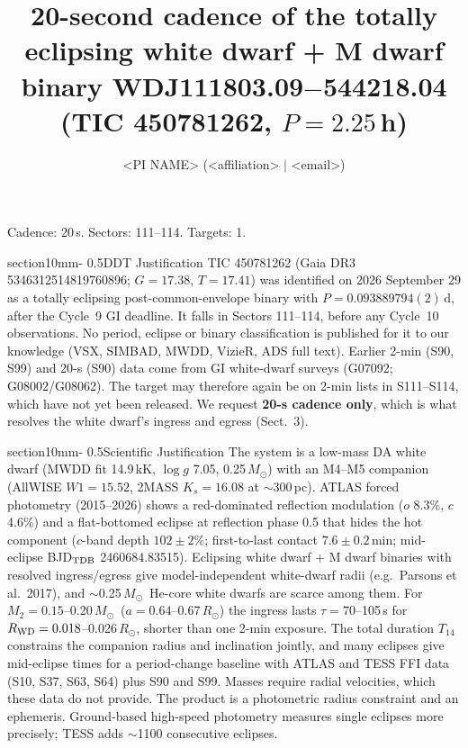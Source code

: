 \documentclass[letterpaper,11pt]{article}
\title{20-second cadence of the totally eclipsing white dwarf + M dwarf binary WDJ111803.09$-$544218.04 (TIC 450781262, $P=2.25$\,h)}
\author{<PI NAME> (<affiliation> $|$ <email>)}
\date{}
\makeatletter
\renewcommand{\section}{\@startsection%
{section}{1}{0mm}{-\baselineskip}%
{0.5\baselineskip}{\normalfont\Large\bfseries}}%
\newcommand{\msun}{$M_{\odot}$}
\newcommand{\rsun}{$R_{\odot}$}
\makeatother
\begin{document}
\pagestyle{plain}
\maketitle
\vspace{-2em}
\noindent Cadence: 20\,s. Sectors: 111--114. Targets: 1.

\section{DDT Justification}
TIC 450781262 (Gaia DR3 5346312514819760896; $G=17.38$, $T=17.41$) was identified on 2026 September 29 as a totally eclipsing post-common-envelope binary with $P=0.093889794(2)$\,d, after the Cycle~9 GI deadline. It falls in Sectors 111--114, before any Cycle~10 observations. No period, eclipse or binary classification is published for it to our knowledge (VSX, SIMBAD, MWDD, VizieR, ADS full text). Earlier 2-min (S90, S99) and 20-s (S90) data come from GI white-dwarf surveys (G07092; G08002/G08062). The target may therefore again be on 2-min lists in S111--S114, which have not yet been released. We request \textbf{20-s cadence only}, which is what resolves the white dwarf's ingress and egress (Sect.~3).

\section{Scientific Justification}
The system is a low-mass DA white dwarf (MWDD fit 14.9\,kK, $\log g$ 7.05, 0.25\,\msun) with an M4--M5 companion (AllWISE $W1=15.52$, 2MASS $K_s=16.08$ at $\sim$300\,pc). ATLAS forced photometry (2015--2026) shows a red-dominated reflection modulation ($o$ 8.3\%, $c$ 4.6\%) and a flat-bottomed eclipse at reflection phase 0.5 that hides the hot component ($c$-band depth $102\pm2$\%; first-to-last contact $7.6\pm0.2$\,min; mid-eclipse BJD$_{\rm TDB}$ 2460684.83515). Eclipsing white dwarf + M dwarf binaries with resolved ingress/egress give model-independent white-dwarf radii (e.g.\ Parsons et al.\ 2017), and $\sim$0.25\,\msun\ He-core white dwarfs are scarce among them. For $M_2=0.15$--0.20\,\msun\ ($a=0.64$--0.67\,\rsun) the ingress lasts $\tau=70$--105\,s for $R_{\rm WD}=0.018$--0.026\,\rsun, shorter than one 2-min exposure. The total duration $T_{14}$ constrains the companion radius and inclination jointly, and many eclipses give mid-eclipse times for a period-change baseline with ATLAS and TESS FFI data (S10, S37, S63, S64) plus S90 and S99. Masses require radial velocities, which these data do not provide. The product is a photometric radius constraint and an ephemeris. Ground-based high-speed photometry measures single eclipses more precisely; TESS adds $\sim$1100 consecutive eclipses.
\end{document}
